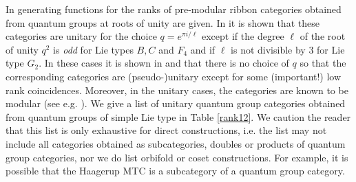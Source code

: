 \documentclass[12pt,psamsfonts]{amsart}
\numberwithin{equation}{section}
\theoremstyle{definition}
\begin{document}
In \cite{rowell06} generating functions for the ranks of
pre-modular ribbon categories obtained from quantum groups at
roots of unity are given.  In \cite{wenzlcstar} it is shown that
these categories are unitary for the choice $q=e^{\pi i/\ell}$
except if the degree $\ell$ of the root of unity $q^2$ is
\emph{odd} for Lie types $B,C$ and $F_4$ and if $\ell$ is not
divisible by $3$ for Lie type $G_2$.  In these cases it is shown
in \cite{rowellmathz} and \cite{grunit} that there is no choice of
$q$ so that the corresponding categories are (pseudo-)unitary
except for some (important!) low rank coincidences.  Moreover, in
the unitary cases, the categories are known to be modular (see
e.g. \cite{BK}).  We give a list of unitary quantum group
categories obtained from quantum groups of simple Lie type in
Table \ref{rank12}. We caution the reader that this list is only
exhaustive for direct constructions, i.e. the list may not include
all categories obtained as subcategories, doubles or products of
quantum group categories, nor we do list orbifold or coset
constructions. For example, it is possible that the Haagerup MTC
is a subcategory of a quantum group category.
\end{document}
